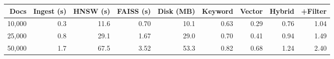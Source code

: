 \begin{tabular}{rrrrrrrrr}
\toprule
Docs & Ingest (s) & HNSW (s) & FAISS (s) & Disk (MB) & Keyword & Vector & Hybrid & +Filter \\
\midrule
10,000 & 0.3 & 11.6 & 0.70 & 10.1 & 0.63 & 0.29 & 0.76 & 1.04 \\
25,000 & 0.8 & 29.1 & 1.67 & 29.0 & 0.70 & 0.41 & 0.94 & 1.49 \\
50,000 & 1.7 & 67.5 & 3.52 & 53.3 & 0.82 & 0.68 & 1.24 & 2.40 \\
\bottomrule
\end{tabular}
